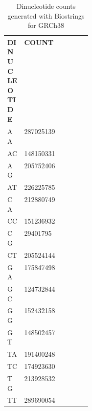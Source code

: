 \begin{table}[ht]
\caption[Dinucleotide counts of GRCh38]{Dinucleotide counts generated with Biostrings \cite{Pages2020} for GRCh38}\label{A:mmf:tab:dicounts}
\centering
{}
\begin{tabular}{|C{0.2\linewidth} | R{0.2\textwidth}|}
\toprule
 \hline
 \textbf{DINUCLEOTIDE} & \textbf{COUNT}\\
 \hline
       AA   & \num{287025139} \\
       AC   & \num{148150331} \\
       AG   & \num{205752406} \\
       AT   & \num{226225785} \\
       CA   & \num{212880749} \\
       CC   & \num{151236932} \\
       CG   & \num{29401795} \\
       CT   & \num{205524144} \\
       GA   & \num{175847498} \\
       GC   & \num{124732844} \\
       GG   & \num{152432158} \\
       GT   & \num{148502457} \\
       TA   & \num{191400248} \\
       TC   & \num{174923630} \\
       TG   & \num{213928532} \\
       TT   & \num{289690054} \\ 
 \hline
 \bottomrule
\end{tabular}
\end{table}

